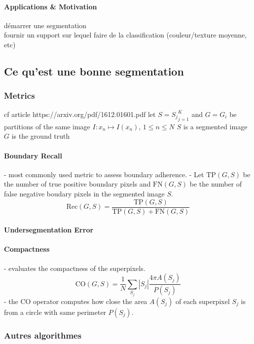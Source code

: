 \documentclass{article}
\begin{document}
            \paragraph{Applications \& Motivation}
            démarrer une segmentation\\
            fournir un support sur lequel faire de la classification (couleur/texture moyenne, etc)


    \subsection{Ce qu'est une bonne \spp segmentation}
        \subsubsection{Metrics}
        cf article https://arxiv.org/pdf/1612.01601.pdf
        let $S = {S_j}^K_{j=1}$ and $G = {G_i}$ be partitions of the same image $I : x_n \mapsto I(x_n)$, $1 \leq n \leq N$
        $S$ is a segmented image
        $G$ is the ground truth
            \paragraph{Boundary Recall}
            - most commonly used metric to assess boundary adherence.
            - Let $\text{TP}(G,S)$ be the number of true positive boundary pixels and $\text{FN}(G,S)$ be the number of false negative boudary pixels in the segmented image $S$.
            $$\mathrm{Rec}(G,S)=\frac{\mathrm{TP}(G,S)}{\mathrm{TP}(G,S)+\mathrm{FN}(G,S)}$$
            \paragraph{Undersegmentation Error}

            \paragraph{Compactness}
            - evaluates the compactness of the superpixels.
            $$
            \mathrm{CO}(G, S)=\frac{1}{N} \sum_{S_{j}}|S_{j}| \frac{4 \pi A\left(S_{j}\right)}{P\left(S_{j}\right)}
            $$
            - the $\mathrm{CO}$ operator computes how close the area $A(S_j)$ of each superpixel $S_j$ is from a circle with same perimeter $P(S_j)$.
        \subsubsection{Autres algorithmes}
\end{document}
